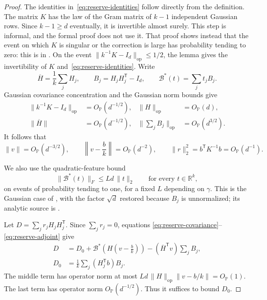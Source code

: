 \documentclass[11pt]{article}
\newcommand{\R}{\mathbb R}
\newcommand{\Pbb}{\mathbb P}
\newcommand{\opnorm}[1]{\lVert#1\rVert_{\mathrm{op}}}
\newcommand{\norm}[1]{\lVert#1\rVert}
\newcommand{\OP}{O_{\Pbb}}
\theoremstyle{remark}
\begin{document}
\begin{proof}
The identities in~\eqref{eq:reserve-identities} follow directly from the
definition. The matrix $K$ has the law of the Gram matrix of $k-1$
independent Gaussian rows. Since $k-1\ge d$ eventually, it is invertible
almost surely. This step is informal, and the formal proof does not use
it. That proof shows instead that the event on which $K$ is singular or
the correction is large has probability tending to zero: this is
 in
. On the event
$\opnorm{k^{-1}K-I_d}\le1/2$, the lemma 
gives the invertibility of $K$ and~\eqref{eq:reserve-identities}. Write
\[
 \overline H=\frac1k\sum_jH_j,\qquad B_j=H_jH_j^{\mathsf T}-I_d,
 \qquad \mathcal B^*(t)=\sum_jt_jB_j.
\]
Gaussian covariance concentration and the Gaussian norm bounds give
\begin{align}
 \opnorm{k^{-1}K-I_d}&=\OP(d^{-1/2}),&
 \opnorm H&=\OP(d),\label{eq:reserve-covariance}\\
 \norm{\overline H}&=\OP(d^{-1/2}),&
 \opnorm{\textstyle\sum_jB_j}&=\OP(d^{3/2}).\nonumber
\end{align}
It follows that
\begin{equation}\label{eq:reserve-inverse}
 \norm v=\OP(d^{-3/2}),\qquad
 \left\|v-\frac bk\right\|=\OP(d^{-2}),\qquad
 \norm r_2^2=b^{\mathsf T}K^{-1}b=\OP(d^{-1}).
\end{equation}

We also use the quadratic-feature bound
\begin{equation}\label{eq:reserve-adjoint}
 \norm{\mathcal B^*(t)}_F\le Ld\,\norm t_2
       \qquad\text{for every }t\in\R^k,
\end{equation}
on events of probability tending to one, for a fixed $L$ depending on
$\gamma$. This is the Gaussian case of ,
with the factor $\sqrt d$ restored because $B_j$ is unnormalized;
its analytic source is \citet[Proposition 3.1]{KoehlerSohn2026}.

Let $D=\sum_jr_jH_jH_j^{\mathsf T}$. Since $\sum_jr_j=0$, equations
\eqref{eq:reserve-covariance}--\eqref{eq:reserve-adjoint} give
\begin{align}
 D&=D_0+
   \mathcal B^*\!\left(H\left(v-\frac bk\right)\right)
   -(\overline H^{\mathsf T}v)\sum_jB_j,
       \label{eq:reserve-decomposition}\\
 D_0&=\frac1k\sum_j(H_j^{\mathsf T}b)B_j.\nonumber
\end{align}
The middle term has operator norm at most
$Ld\,\opnorm H\norm{v-b/k}=\OP(1)$. The last term has operator norm
$\OP(d^{-1/2})$. Thus it suffices to bound $D_0$.


\end{proof}
\end{document}
